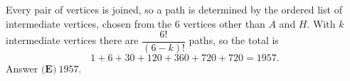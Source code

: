 Every pair of vertices is joined, so a path is determined by the ordered list of intermediate vertices, chosen from the $6$ vertices other than $A$ and $H$. With $k$ intermediate vertices there are $\dfrac{6!}{(6-k)!}$ paths, so the total is
\[1+6+30+120+360+720+720=1957.\]
Answer $\boxed{\textbf{(E)}\ 1957}$.
